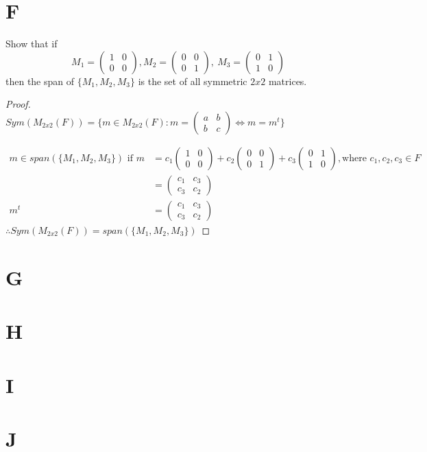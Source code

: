 \documentclass[11pt]{scrartcl}
\makeatletter
\newenvironment{Dequation}
  {%
  \def\tagform@##1{%
    \maketag@@@{\makebox[0pt][r]{(\ignorespaces##1\unskip\@@italiccorr)}}}%
  \ignorespaces
  }
  {%
  \def\tagform@##1{\maketag@@@{(\ignorespaces##1\unskip\@@italiccorr)}}%
  \ignorespacesafterend
  }
\makeatother
\begin{document}
\section{F}
Show that if 
\[
M_1 = 
\begin{pmatrix}
1 & 0 \\
0 & 0 
\end{pmatrix},
M_2 = 
\begin{pmatrix}
0 & 0 \\
0 & 1 
\end{pmatrix},
\
M_3 = 
\begin{pmatrix}
0 & 1 \\
1 & 0 
\end{pmatrix}
\]
then the span of $\{M_1, M_2, M_3\}$ is the set of all symmetric $2x2$ matrices.

\begin{proof}
	\-\\
	$Sym(M_{2x2}(F)) = \{m \in M_{2x2}(F): m = \begin{pmatrix} a & b \\ b & c \end{pmatrix}  \Leftrightarrow m = m^t\}$
	\begin{Dequation}
	\begin{align*}
		m \in span(\{M_1, M_2, M_3\}) \text{ if } m & = c_1 
	\begin{pmatrix}
	1 & 0 \\
	0 & 0 
	\end{pmatrix}+
	c_2
	\begin{pmatrix}
	0 & 0 \\
	0 & 1 
	\end{pmatrix}+
	c_3
	\begin{pmatrix}
	0 & 1 \\
	1 & 0 
	\end{pmatrix}, \text{where } c_1, c_2, c_3 \in F\\
	& =\begin{pmatrix}
	c_1 & c_3 \\
	c_3 & c_2 
	\end{pmatrix}\\
		m^t & = 
	\begin{pmatrix}
	c_1 & c_3 \\
	c_3 & c_2 
	\end{pmatrix}
	\end{align*}
	\end{Dequation}
	$\therefore Sym(M_{2x2}(F)) = span(\{M_1, M_2, M_3\})$
\end{proof}

\section{G}

\section{H}

\section{I}

\section{J}
\end{document}
